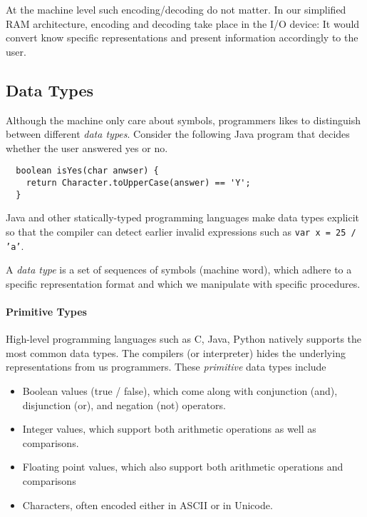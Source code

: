 \documentclass{aldast}
\begin{document}
At the machine level such encoding/decoding do not matter. In our
simplified RAM architecture, encoding and decoding take place in the
I/O device: It would convert know specific representations and present
information accordingly to the user.


\subsection{Data Types}

Although the machine only care about symbols, programmers likes to
distinguish between different \emph{data types}. Consider the
following Java program that decides whether the user answered yes or
no.

\begin{verbatim}
  boolean isYes(char anwser) {
    return Character.toUpperCase(answer) == 'Y';
  }
\end{verbatim}

Java and other statically-typed programming languages make data types
explicit so that the compiler can detect earlier invalid expressions such as
\texttt{var x = 25 / 'a'}.

\begin{takeaway}
  A \emph{data type} is a set of sequences of symbols (machine word),
  which adhere to a specific representation format and which we
  manipulate with specific procedures.
\end{takeaway}

\paragraph{Primitive Types}

High-level programming languages such as C, Java, Python natively
supports the most common data types. The compilers (or interpreter)
hides the underlying representations from us programmers. These
\emph{primitive} data types include
\begin{itemize}
\item Boolean values (true / false), which come along with
  conjunction (and), disjunction (or), and negation (not) operators.
\item Integer values, which support both arithmetic operations as
  well as comparisons.
\item Floating point values, which also support both arithmetic
  operations and comparisons
\item Characters, often encoded either in ASCII or in Unicode.
\end{itemize}
\end{document}
